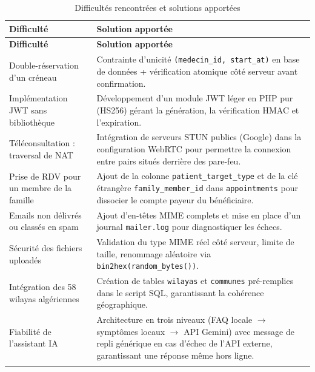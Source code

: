 \documentclass[12pt,a4paper]{report}
\begin{document}
\begin{longtable}{|p{5.5cm}|p{9cm}|}
\hline
\textbf{Difficult\'e} & \textbf{Solution apport\'ee} \\
\hline
\endfirsthead
\hline
\textbf{Difficult\'e} & \textbf{Solution apport\'ee} \\
\hline
\endhead
\hline
\endlastfoot
Double-r\'eservation d'un cr\'eneau & Contrainte d'unicit\'e \texttt{(medecin\_id, start\_at)} en base de donn\'ees + v\'erification atomique c\^ot\'e serveur avant confirmation. \\
\hline
Impl\'ementation JWT sans biblioth\`eque & D\'eveloppement d'un module JWT l\'eger en PHP pur (HS256) g\'erant la g\'en\'eration, la v\'erification HMAC et l'expiration. \\
\hline
T\'el\'econsultation : traversal de NAT & Int\'egration de serveurs STUN publics (Google) dans la configuration WebRTC pour permettre la connexion entre pairs situ\'es derri\`ere des pare-feu. \\
\hline
Prise de RDV pour un membre de la famille & Ajout de la colonne \texttt{patient\_target\_type} et de la cl\'e \'etrang\`ere \texttt{family\_member\_id} dans \texttt{appointments} pour dissocier le compte payeur du b\'en\'eficiaire. \\
\hline
Emails non d\'elivr\'es ou class\'es en spam & Ajout d'en-t\^etes MIME complets et mise en place d'un journal \texttt{mailer.log} pour diagnostiquer les \'echecs. \\
\hline
S\'ecurit\'e des fichiers upload\'es & Validation du type MIME r\'eel c\^ot\'e serveur, limite de taille, renommage al\'eatoire via \texttt{bin2hex(random\_bytes())}. \\
\hline
Int\'egration des 58 wilayas alg\'eriennes & Cr\'eation de tables \texttt{wilayas} et \texttt{communes} pr\'e-remplies dans le script SQL, garantissant la coh\'erence g\'eographique. \\
\hline
Fiabilit\'e de l'assistant IA & Architecture en trois niveaux (FAQ locale $\rightarrow$ sympt\^omes locaux $\rightarrow$ API Gemini) avec message de repli g\'en\'erique en cas d'\'echec de l'API externe, garantissant une r\'eponse m\^eme hors ligne. \\
\hline
\caption{Difficult\'es rencontr\'ees et solutions apport\'ees}
\end{longtable}

\newpage

\thispagestyle{empty}
\vspace*{\fill}
\end{document}
